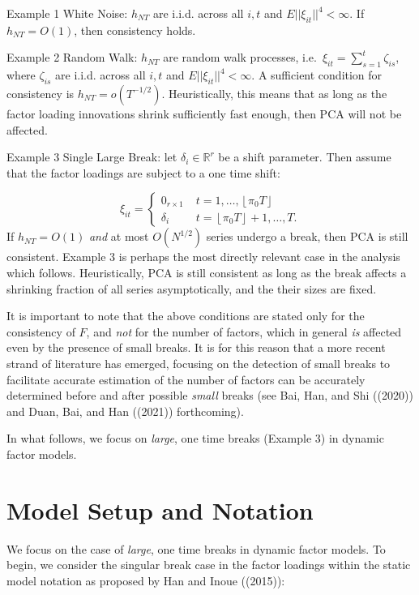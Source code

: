 \documentclass[
]{article}
\begin{document}
Example 1 White Noise: \(h_{NT}\) are i.i.d. across all \(i, t\) and
\(E||\xi_{it}||^4 <\infty\). If \(h_{NT} = O(1)\), then consistency
holds.

Example 2 Random Walk: \(h_{NT}\) are random walk processes,
i.e.~\(\xi_{it} = \sum_{s = 1}^{t} \zeta_{is}\), where \(\zeta_{is}\)
are i.i.d. across all \(i, t\) and \(E||\xi_{it}||^4 <\infty\). A
sufficient condition for consistency is \(h_{NT} = o(T^{-1/2})\).
Heuristically, this means that as long as the factor loading innovations
shrink sufficiently fast enough, then PCA will not be affected.

Example 3 Single Large Break: let \(\delta_i \in \mathbb{R}^r\) be a
shift parameter. Then assume that the factor loadings are subject to a
one time shift:

\[
\xi_{it} = \begin{cases}
0_{r \times 1} \; &t = 1, \dots, \left \lfloor \pi_0 T \right \rfloor  \\
\delta_i \; &t = \left \lfloor \pi_0 T \right \rfloor  + 1, \dots, T.
\end{cases}
\] If \(h_{NT} = O(1)\) \emph{and} at most \(O(N^{1/2})\) series undergo
a break, then PCA is still consistent. Example 3 is perhaps the most
directly relevant case in the analysis which follows. Heuristically, PCA
is still consistent as long as the break affects a shrinking fraction of
all series asymptotically, and the their sizes are fixed.

It is important to note that the above conditions are stated only for
the consistency of \(F\), and \emph{not} for the number of factors,
which in general \emph{is} affected even by the presence of small
breaks. It is for this reason that a more recent strand of literature
has emerged, focusing on the detection of small breaks to facilitate
accurate estimation of the number of factors can be accurately
determined before and after possible \emph{small} breaks (see Bai, Han,
and Shi ((2020)) and Duan, Bai, and Han ((2021)) forthcoming).

In what follows, we focus on \emph{large}, one time breaks (Example 3)
in dynamic factor models.

\hypertarget{model-setup-and-notation}{%
\section{Model Setup and Notation}\label{model-setup-and-notation}}

We focus on the case of \emph{large}, one time breaks in dynamic factor
models. To begin, we consider the singular break case in the factor
loadings within the static model notation as proposed by Han and Inoue
((2015)):
\end{document}
